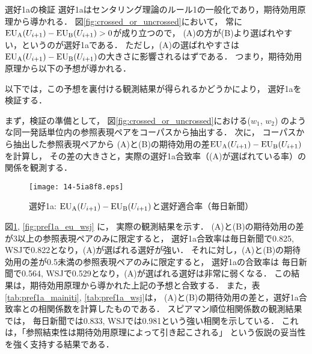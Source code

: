 \documentclass[japanese]{jnlp_1.3e}
\renewcommand{\paragraph}{}
\begin{document}
\paragraph{選好1aの検証} 
選好1aはセンタリング理論のルール1の一般化であり，期待効用原理から導かれる．
図\ref{fig:crossed_or_uncrossed}において，
常に${\rm EU_A}(U_{i+1})-{\rm EU_B}(U_{i+1})>0$が成り立つので，
(A)の方が(B)より選ばれやすい，というのが選好1aである．
ただし，(A)の選ばれやすさは
${\rm EU_A}(U_{i+1})-{\rm EU_B}(U_{i+1})$の大きさに影響されるはずである．
つまり，期待効用原理から以下の予想が導かれる．

    \vspace{\baselineskip}

\noindent
以下では，この予想を裏付ける観測結果が得られるかどうかにより，
選好1aを検証する．

まず，検証の準備として，
図\ref{fig:crossed_or_uncrossed}における($w_1$, $w_2$) のような同一発話単位内の参照表現ペアをコーパスから抽出する．
次に，
コーパスから抽出した参照表現ペアから
(A)と(B)の期待効用の差${\rm EU_A}(U_{i+1})-{\rm EU_B}(U_{i+1})$を計算し，
その差の大きさと，実際の選好1a合致率（(A)が選ばれている率）の関係を観測する．

\begin{figure}[b]
\begin{center}
      \texttt{[image: 14-5ia8f8.eps]}
  \caption{選好1a: ${\rm EU_A}(U_{i+1})-{\rm EU_B}(U_{i+1})$と選好適合率（毎日新聞）}
  \label{fig:pref1a_eu_mainiti}
 \end{center}
\end{figure}


図\ref{fig:pref1a_eu_mainiti}, \ref{fig:pref1a_eu_wsj} に，
実際の観測結果を示す．
(A)と(B)の期待効用の差が3以上の参照表現ペアのみに限定すると，
選好1a合致率は毎日新聞で0.825, WSJで0.822となり，(A)が選ばれる選好が強い．
それに対し，(A)と(B)の期待効用の差が0.5未満の参照表現ペアのみに限定すると，
選好1aの合致率は
毎日新聞で0.564, WSJで0.529となり，(A)が選ばれる選好は非常に弱くなる．
この結果は，期待効用原理から導かれた上記の予想と合致する．
また，表\ref{tab:pref1a_mainiti}, \ref{tab:pref1a_wsj}は，
(A)と(B)の期待効用の差と，選好1a合致率との相関係数を計算したものである．
スピアマン順位相関係数の観測結果では，
毎日新聞では0.833, WSJでは0.981という強い相関を示している．
これは，「参照結束性は期待効用原理によって引き起こされる」
という仮説の妥当性を強く支持する結果である．
\end{document}

